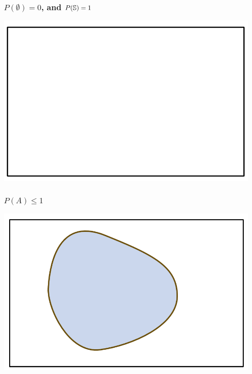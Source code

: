 \documentclass[compress]{beamer}
\begin{document}
%
%
%



\begin{frame}\frametitle{  $P(\emptyset)= 0$, and   $P(\mathbb{S})= 1$}
\begin{center}
\includegraphics[scale=.4]{figs/SampleSpace.png} 
\end{center}
\vspace{1in}
\end{frame}


\begin{frame}\frametitle{  $P(A)\leq 1$}
\begin{center}
\includegraphics[scale=.4]{figs/PALess1.png} 
\end{center}
\vspace{1in}
\end{frame}
\end{document}
